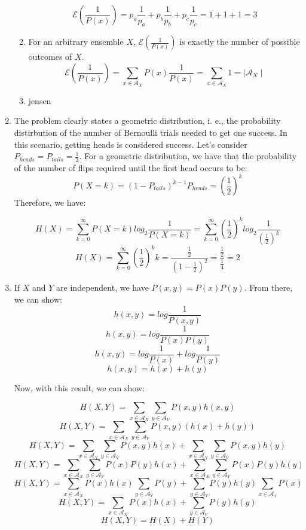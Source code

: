 \documentclass{article}
\begin{document}
\begin{enumerate}
\begin{enumerate}
		            \[\mathcal{E}(\frac{1}{P(x)}) = p_a \frac{1}{p_a} + p_b \frac{1}{p_b} + p_c \frac{1}{p_c} = 1 + 1 + 1 = 3\]

		      \item For an arbitrary ensemble \(X\), \(\mathcal{E}(\frac{1}{P(x)})\) is exactly the number of possible outcomes of \(X\).
		            \[\mathcal{E}(\frac{1}{P(x)}) = \sum_{x \in \mathcal{A}_X} P(x) \frac{1}{P(x)} = \sum_{x \in \mathcal{A}_X} 1 = \mid\mathcal{A}_X\mid\]

		      \item jensen
	      \end{enumerate}

	\item The problem clearly states a geometric distribution, i. e., the probability distirbution of the number of Bernoulli trials needed to get one success. In this scenario, getting heads is considered success. Let's consider \(P_{heads} = P_{tails} = \frac{1}{2}\). For a geometric distribution, we have that the probability of the number of flips required until the first head occurs to be:
	      \[P(X = k) = (1 - P_{tails})^{k-1} P_{heads} = (\frac{1}{2})^k\]
	      Therefore, we have:

	      \[H(X) = \sum_{k=0}^{\infty} P(X = k) log_2 \frac{1}{P(X = k)} = \sum_{k=0}^{\infty} (\frac{1}{2})^k log_2 \frac{1}{(\frac{1}{2})^k}\]
	      \[H(X) = \sum_{k=0}^{\infty} (\frac{1}{2})^k k = \frac{\frac{1}{2}}{(1 - \frac{1}{2})^2} = \frac{\frac{1}{2}}{\frac{1}{4}} = 2\]

      \item If \(X\) and \(Y\) are independent, we have \(P(x, y) = P(x)P(y)\). From there, we can show:
          \[h(x, y) = log \frac{1}{P(x, y)}\]
          \[h(x, y) = log \frac{1}{P(x)P(y)}\]
          \[h(x, y) = log \frac{1}{P(x)} + log \frac{1}{P(y)}\]
          \[h(x, y) = h(x) + h(y)\]
        
        Now, with this result, we can show:
        
        \[H(X, Y) = \sum_{x \in \mathcal{A}_X} \sum_{y \in \mathcal{A}_Y} P(x, y)h(x, y)\]
        \[H(X, Y) = \sum_{x \in \mathcal{A}_X} \sum_{y \in \mathcal{A}_Y} P(x, y)(h(x) + h(y))\]
        \[H(X, Y) = \sum_{x \in \mathcal{A}_X} \sum_{y \in \mathcal{A}_Y} P(x, y)h(x) + \sum_{x \in \mathcal{A}_X} \sum_{y \in \mathcal{A}_Y} P(x, y)h(y)\]
        \[H(X, Y) = \sum_{x \in \mathcal{A}_X} \sum_{y \in \mathcal{A}_Y} P(x)P(y)h(x) + \sum_{x \in \mathcal{A}_X} \sum_{y \in \mathcal{A}_Y} P(x)P(y)h(y)\]
        \[H(X, Y) = \sum_{x \in \mathcal{A}_X} P(x)h(x) \sum_{y \in \mathcal{A}_Y} P(y) + \sum_{y \in \mathcal{A}_Y} P(y)h(y) \sum_{x \in \mathcal{A}_x} P(x)\]
        \[H(X, Y) = \sum_{x \in \mathcal{A}_X} P(x)h(x) + \sum_{y \in \mathcal{A}_Y} P(y)h(y) \]
        \[H(X, Y) = H(X) + H(Y)\]


\end{enumerate}
\end{document}
